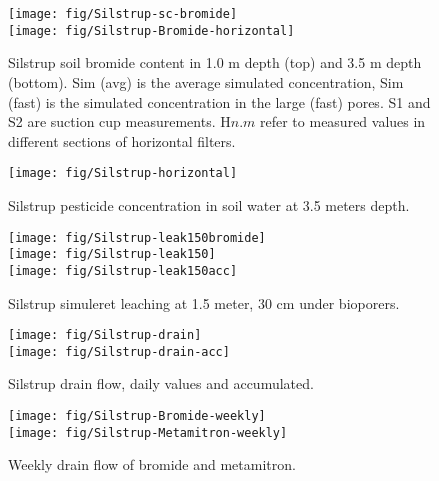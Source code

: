 \begin{figure}[htbp]
  \begin{center}
    \texttt{[image: fig/Silstrup-sc-bromide]}\\
    \texttt{[image: fig/Silstrup-Bromide-horizontal]}
  \end{center}
  \caption{Silstrup soil bromide content in 1.0 m depth (top) and 3.5
    m depth (bottom).  Sim (avg) is the average simulated
    concentration, Sim (fast) is the simulated concentration in the
    large (fast) pores.  S1 and S2 are suction cup measurements.
    H$n$.$m$ refer to measured values in different sections of
    horizontal filters.}
  \label{fig:Silstrup-bromide}
\end{figure}\FloatBarrier

\begin{figure}[htbp]
  \begin{center}
    \texttt{[image: fig/Silstrup-horizontal]}
  \end{center}
  \caption{Silstrup pesticide concentration in soil water at 3.5 meters depth.}
  \label{fig:Silstrup-horizontal}
\end{figure}\FloatBarrier

\begin{figure}[htbp]
  \begin{center}
    \texttt{[image: fig/Silstrup-leak150bromide]}\\
    \texttt{[image: fig/Silstrup-leak150]}\\
    \texttt{[image: fig/Silstrup-leak150acc]}
  \end{center}
  \caption{Silstrup simuleret leaching at 1.5 meter, 30 cm under bioporers.}
  \label{fig:Silstrup-leak150}
\end{figure}\FloatBarrier

\begin{figure}[htbp]
  \begin{center}
    \texttt{[image: fig/Silstrup-drain]}\\
    \texttt{[image: fig/Silstrup-drain-acc]}
  \end{center}
  \caption{Silstrup drain flow, daily values and accumulated.}
  \label{fig:Silstrup-drain}
\end{figure}\FloatBarrier

\begin{figure}[htbp]
  \begin{center}
    \texttt{[image: fig/Silstrup-Bromide-weekly]}\\
    \texttt{[image: fig/Silstrup-Metamitron-weekly]}
  \end{center}
  \caption{Weekly drain flow of bromide and metamitron.}
  \label{fig:Silstrup-weekly}
\end{figure}\FloatBarrier

